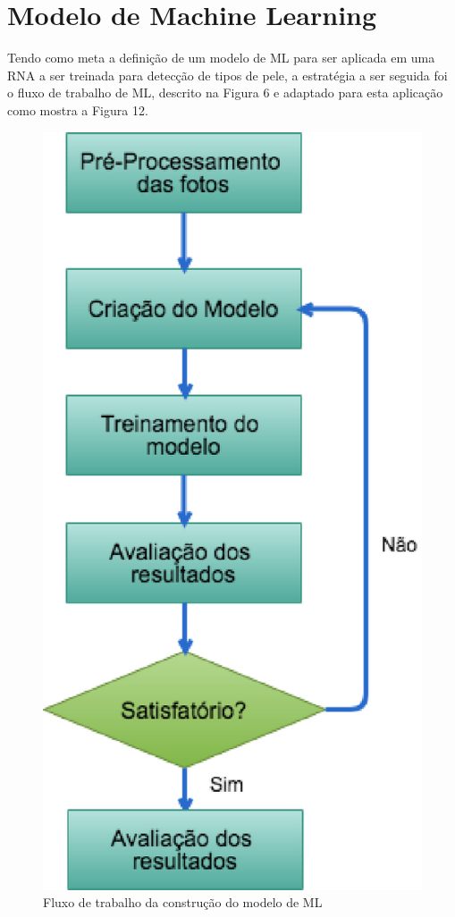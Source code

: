 \section{Modelo de Machine Learning}

    Tendo como meta a definição de um modelo de ML para ser aplicada em uma RNA a ser treinada para detecção de tipos de pele, a estratégia a ser seguida foi o fluxo de trabalho de ML, descrito na Figura 6 e adaptado para esta aplicação como mostra a Figura 12.

    \begin{figure}[ht]
        \centering
        \label{fig12}
            \includegraphics[keepaspectratio=true, scale=0.6]{editaveis/images/ml_nt_flow.eps}
        \caption{Fluxo de trabalho da construção do modelo de ML}
    \end{figure}

